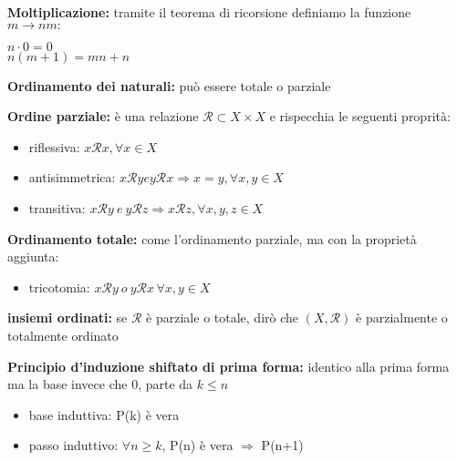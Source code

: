 \documentclass[11pt, letterpaper]{article}
\begin{document}
\textbf{Moltiplicazione:} tramite il teorema di ricorsione definiamo la funzione $m\rightarrow nm:$
\begin{center}
    $n\cdot 0 = 0$\\
    $n(m+1)=mn+n$
\end{center}

\textbf{Ordinamento dei naturali:} può essere totale o parziale

\textbf{Ordine parziale:} è una relazione $\mathcal{R}\subset X\times X$ e rispecchia le seguenti proprità:
\begin{itemize}
    \item riflessiva: $x\mathcal{R}x, \forall x\in X$
    \item antisimmetrica: $x\mathcal{R}y e y\mathcal{R} x\Rightarrow x=y, \forall x,y \in X$
    \item transitiva: $x\mathcal{R}y\ e\ y\mathcal{R} z\Rightarrow x\mathcal{R}z, \forall x,y,z \in X$
\end{itemize}

\textbf{Ordinamento totale:} come l'ordinamento parziale, ma con la proprietà aggiunta:
\begin{itemize}
    \item tricotomia: $x\mathcal{R}y\ o\ y\mathcal{R} x\, \forall x,y \in X$
\end{itemize}

\textbf{insiemi ordinati:} se $\mathcal{R}$ è parziale o totale, dirò che $(X,\mathcal{R})$ è 
parzialmente o totalmente ordinato

\textbf{Principio d'induzione shiftato di prima forma:} identico alla prima forma ma la base
invece che 0, parte da $k\leq n$
\begin{itemize}
    \item base induttiva: P(k) è vera
    \item passo induttivo: $\forall n\geq k$, P(n) è vera $\Rightarrow$ P(n+1)
\end{itemize}
\end{document}
